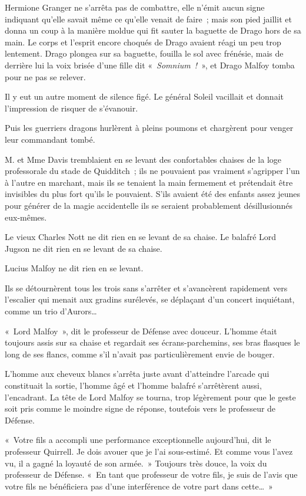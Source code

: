Hermione Granger ne s'arrêta pas de combattre, elle n'émit aucun signe indiquant qu'elle savait même ce qu'elle venait de faire~; mais son pied jaillit et donna un coup à la manière moldue qui fit sauter la baguette de Drago hors de sa main. Le corps et l'esprit encore choqués de Drago avaient réagi un peu trop lentement. Drago plongea sur sa baguette, fouilla le sol avec frénésie, mais de derrière lui la voix brisée d'une fille dit «~\emph{Somnium~!}~», et Drago Malfoy tomba pour ne pas se relever.

Il y eut un autre moment de silence figé. Le général Soleil vacillait et donnait l'impression de risquer de s'évanouir.

Puis les guerriers dragons hurlèrent à pleins poumons et chargèrent pour venger leur commandant tombé.

\later

M. et Mme Davis tremblaient en se levant des confortables chaises de la loge professorale du stade de Quidditch~; ils ne pouvaient pas vraiment s'agripper l'un à l'autre en marchant, mais ils se tenaient la main fermement et prétendait être invisibles du plus fort qu'ils le pouvaient. S'ils avaient été des enfants assez jeunes pour générer de la magie accidentelle ils se seraient probablement désillusionnés eux-mêmes.

Le vieux Charles Nott ne dit rien en se levant de sa chaise. Le balafré Lord Jugson ne dit rien en se levant de sa chaise.

Lucius Malfoy ne dit rien en se levant.

Ils se détournèrent tous les trois sans s'arrêter et s'avancèrent rapidement vers l'escalier qui menait aux gradins surélevés, se déplaçant d'un concert inquiétant, comme un trio d'Aurors…

«~Lord Malfoy~», dit le professeur de Défense avec douceur. L'homme était toujours assis sur sa chaise et regardait ses écrans-parchemins, ses bras flasques le long de ses flancs, comme s'il n'avait pas particulièrement envie de bouger.

L'homme aux cheveux blancs s'arrêta juste avant d'atteindre l'arcade qui constituait la sortie, l'homme âgé et l'homme balafré s'arrêtèrent aussi, l'encadrant. La tête de Lord Malfoy se tourna, trop légèrement pour que le geste soit pris comme le moindre signe de réponse, toutefois vers le professeur de Défense.

«~Votre fils a accompli une performance exceptionnelle aujourd'hui, dit le professeur Quirrell. Je dois avouer que je l'ai sous-estimé. Et comme vous l'avez vu, il a gagné la loyauté de son armée.~» Toujours très douce, la voix du professeur de Défense. «~En tant que professeur de votre fils, je suis de l'avis que votre fils ne bénéficiera pas d'une interférence de votre part dans cette…~»

